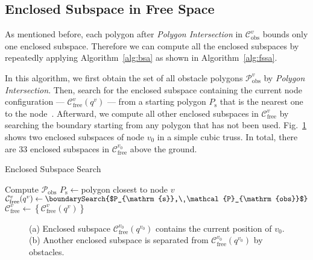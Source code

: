 \documentclass[journal]{IEEEtran}
\begin{document}
\subsection{Enclosed Subspace in Free Space}
\label{sec:cells}

As mentioned before, each polygon after \textit{Polygon Intersection}
in $\mathcal{C}_{\mathrm{obs}}^v$ bounds only one enclosed
subspace. Therefore we can compute all the enclosed subspaces by
repeatedly applying Algorithm~\ref{alg:bsa} as shown in
Algorithm~\ref{alg:fssa}.

In this algorithm, we first obtain the set of all obstacle polygons
$\mathcal{P}_{\mathrm{obs}}^v$ by \textit{Polygon Intersection}. Then,
search for the enclosed subspace containing the current node
configuration --- $\mathcal{C}_{\mathrm{free}}^v(q^v)$ --- from a
starting polygon $P_{\mathrm{s}}$ that is the nearest one to the
node~\cite{Liu-vtt-cspace-icra-2020}. Afterward, we compute all other
enclosed subspaces in $\mathcal{C}_{\mathrm{free}}^v$ by searching the
boundary starting from any polygon that has not been
used. Fig.~\ref{fig:enclosed-subspace-example} shows two enclosed
subspaces of node $v_0$ in a simple cubic truss. In total, there are
33 enclosed subspaces in $\mathcal{C}_{\mathrm{free}}^{v_0}$ above the
ground.

\begin{algorithm}[t ]
  \caption{Enclosed Subspace Search}\label{alg:fssa}
  Compute $\mathcal{P}_{\mathrm{obs}}$\;
  $P_{\mathrm{s}}\leftarrow$polygon closest to node $v$\;
  $\mathcal{C}_{\mathrm{free}}^v(q^v)\leftarrow\boundarySearch{$P_{\mathrm{s}},\ \mathcal{P}_{\mathrm{obs}}$}$\;
  $\mathcal{C}_{\mathrm{free}}^v\leftarrow\left\{\mathcal{C}_{\mathrm{free}}^v(q^v)\right\}$\;
\end{algorithm}

\begin{figure}[t]
  \centering
  \hfil
  \caption{(a) Enclosed subspace
    $\mathcal{C}_{\mathrm{free}}^{v_0}(q^{v_0})$ contains the current
    position of $v_0$. (b) Another enclosed subspace is separated from
    $\mathcal{C}_{\mathrm{free}}^{v_0}(q^{v_0})$ by obstacles.}
  \label{fig:enclosed-subspace-example}
\end{figure}
\end{document}
